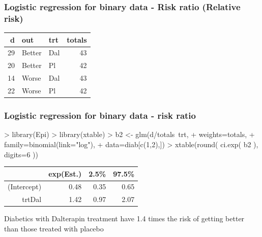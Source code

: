 \documentclass[handout,12pt,dvipsnames,t]{beamer}
\begin{document}
\begin{frame}[fragile]
\frametitle{Logistic regression for binary data - Risk ratio (Relative risk)}

\footnotesize{
\begin{Schunk}
\begin{table}[ht]
\centering
\begin{tabular}{rllr}
  \hline
d & out & trt & totals \\ 
  \hline
29 & Better & Dal & 43 \\ 
  20 & Better & Pl & 42 \\ 
  14 & Worse & Dal & 43 \\ 
  22 & Worse & Pl & 42 \\ 
   \hline
\end{tabular}
\end{table}\end{Schunk}
}

\end{frame}

\begin{frame}[fragile]
\frametitle{Logistic regression for binary data - risk ratio}

\begin{Schunk}
\begin{Sinput}
> library(Epi)
> library(xtable)
> b2 <- glm(d/totals~trt, 
+           weights=totals,
+           family=binomial(link="log"),
+           data=diab[c(1,2),])
> xtable(round( ci.exp( b2 ), digits=6 ))
\end{Sinput}
\begin{table}[ht]
\centering
\begin{tabular}{rrrr}
  \hline
 & exp(Est.) & 2.5\% & 97.5\% \\ 
  \hline
(Intercept) & 0.48 & 0.35 & 0.65 \\ 
  trtDal & 1.42 & 0.97 & 2.07 \\ 
   \hline
\end{tabular}
\end{table}\end{Schunk}

Diabetics with Dalterapin treatment have 1.4 times the risk of getting better than  
those treated with placebo

\end{frame}
\end{document}
